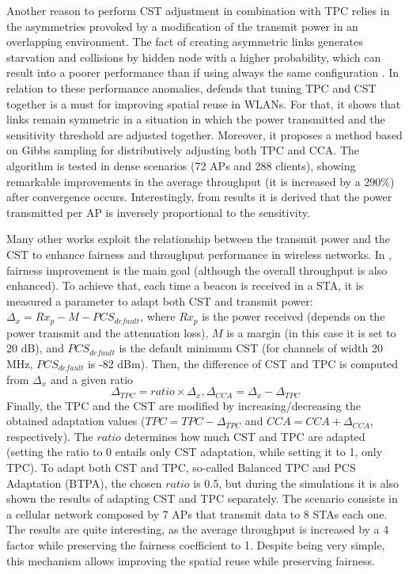 \documentclass[12pt, a4paper,twoside]{tesi_upf}
\begin{document}
			Another reason to perform CST adjustment in combination with TPC relies in the asymmetries provoked by a modification of the transmit power in an overlapping environment. The fact of creating asymmetric links generates starvation and collisions by hidden node with a higher probability, which can result into a poorer performance than if using always the same configuration \cite{kawadia2005principles}. In relation to these performance anomalies, \cite{mhatre2007interference} defends that tuning TPC and CST together is a must for improving spatial reuse in WLANs. For that, it shows that links remain symmetric in a situation in which the power transmitted and the sensitivity threshold are adjusted together. Moreover, it proposes a method based on Gibbs sampling for distributively adjusting both TPC and CCA. The algorithm is tested in dense scenarios (72 APs and 288 clients), showing remarkable improvements in the average throughput (it is increased by a $290\%$) after convergence occurs. Interestingly, from results it is derived that the power transmitted per AP is inversely proportional to the sensitivity.				
			
			Many other works exploit the relationship between the transmit power and the CST to enhance fairness and throughput performance in wireless networks. In \cite{jamil2015preserving}, fairness improvement is the main goal (although the overall throughput is also enhanced). To achieve that, each time a beacon is received in a STA, it is measured a parameter to adapt both CST and transmit power: $\Delta_x = Rx_p - M - PCS_{default}$, where $Rx_p$ is the power received (depends on the power transmit and the attenuation loss), $M$ is a margin (in this case it is set to 20 dB), and $PCS_{default}$ is the default minimum CST (for channels of width 20 MHz, $PCS_{default}$ is -82 dBm). Then, the difference of CST and TPC is computed from $\Delta_x$ and a given ratio
			\begin{equation}
				\Delta_{TPC} = ratio \times \Delta_x, \Delta_{CCA} = \Delta_x - \Delta_{TPC}
				\nonumber
			\end{equation}
			Finally, the TPC and the CST are modified by increasing/decreasing the obtained adaptation values ($TPC = TPC - \Delta_{TPC}$ and $CCA = CCA + \Delta_{CCA}$, respectively). The $ratio$ determines how much CST and TPC are adapted (setting the ratio to 0 entails only CST adaptation, while setting it to 1, only TPC). To adapt both CST and TPC, so-called Balanced TPC and PCS Adaptation (BTPA), the chosen $ratio$ is 0.5, but during the simulations it is also shown the results of adapting CST and TPC separately. The scenario consists in a cellular network composed by 7 APs that transmit data to 8 STAs each one.	The results are quite interesting, as the average throughput is increased by a 4 factor while preserving the fairness coefficient to 1. Despite being very simple, this mechanism allows improving the spatial reuse while preserving fairness. 
			
\end{document}
